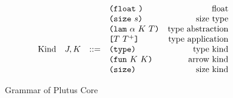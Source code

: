 \documentclass[../main.tex]{subfiles}
\begin{document}
\begin{figure*}[t]
\[\begin{array}{lrclr}
                                  &     &     & \texttt{(} \mathtt{float} ~  \texttt{)}                  & \textrm{float}\\
                                  &     &     & \texttt{(} \mathtt{size} ~ s \texttt{)}                  & \textrm{size type}\\
                                  &     &     & \texttt{(} \mathtt{lam} ~ \alpha ~ K ~ T \texttt{)}        & \textrm{type abstraction}\\
                                  &     &     & \texttt{[} T ~ T^+ \texttt{]}              & \textrm{type application}\\
        \textrm{Kind}             & J,K   & ::= & \texttt{(} \mathtt{type} \texttt{)}{}                   & \textrm{type kind}\\
                                  &     &     & \texttt{(} \mathtt{fun} ~ K ~ K \texttt{)}                & \textrm{arrow kind}\\
                                  &     &     & \texttt{(} \mathtt{size} \texttt{)}{}                   & \textrm{size kind}\\

    \end{array}\]
    \caption{Grammar of Plutus Core}
    \label{fig:Plutus_core_grammar}
\end{figure*}
\end{document}
